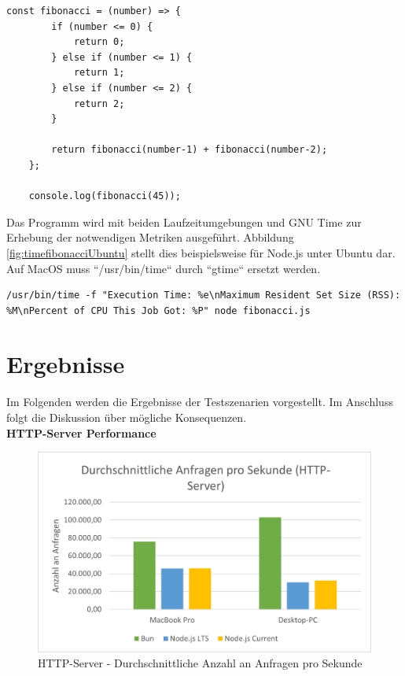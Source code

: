 \begin{lstlisting}[caption={Berechnung der Fibonacci-Folge},label={fig:fibonacci}]
	const fibonacci = (number) => {
		if (number <= 0) {
			return 0;
		} else if (number <= 1) {
			return 1;
		} else if (number <= 2) {
			return 2;
		}
		
		return fibonacci(number-1) + fibonacci(number-2);
	};
	
	console.log(fibonacci(45));
\end{lstlisting}

\noindent
Das Programm wird mit beiden Laufzeitumgebungen und GNU Time zur Erhebung der notwendigen Metriken ausgeführt. Abbildung \ref{fig:timefibonacciUbuntu} stellt dies beispielsweise für Node.js unter Ubuntu dar. Auf MacOS muss ``/usr/bin/time`` durch ``gtime`` ersetzt werden.
\begin{lstlisting}[caption={Messung der Fibonacci-Berechnung in Node.js unter Ubuntu},label={fig:timefibonacciUbuntu}]
	/usr/bin/time -f "Execution Time: %e\nMaximum Resident Set Size (RSS): %M\nPercent of CPU This Job Got: %P" node fibonacci.js
\end{lstlisting}



\section{Ergebnisse} \label{sec:performance-results}
Im Folgenden werden die Ergebnisse der Testszenarien vorgestellt. Im Anschluss folgt die Diskussion über mögliche Konsequenzen.\\

\noindent
\textbf{HTTP-Server Performance}
\begin{figure}[h!]
	\centering
	\includegraphics[width=\linewidth]{./images/httpServerAverageRequestsPerSecond.png}
	\caption{HTTP-Server - Durchschnittliche Anzahl an Anfragen pro Sekunde}
	\label{fig:httpServerAverageRequestsPerSecond}
\end{figure}


